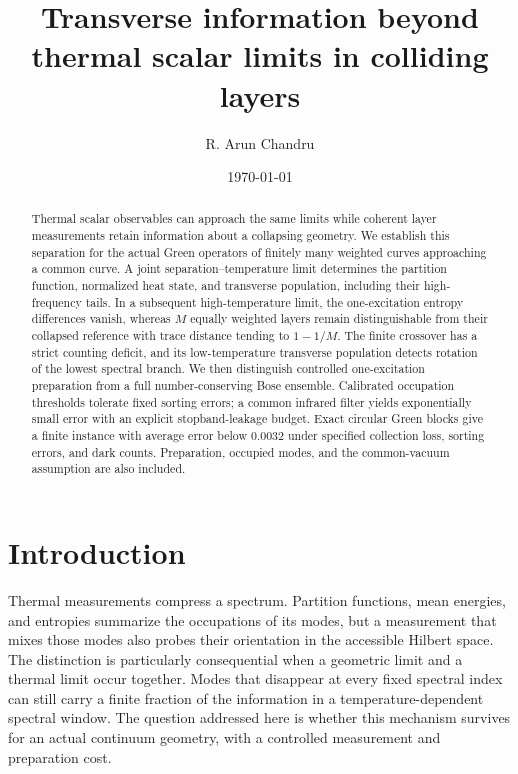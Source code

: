 \documentclass[aps,pra,reprint,superscriptaddress,longbibliography]{revtex4-2}
\begin{document}
\title{Transverse information beyond thermal scalar limits in colliding layers}
\author{R. Arun Chandru}
\date{\today}
\begin{abstract}
Thermal scalar observables can approach the same limits while coherent
layer measurements retain information about a collapsing geometry.
We establish this separation for the actual Green operators of finitely
many weighted curves approaching a common curve. A joint separation--temperature
limit determines the partition function, normalized heat state, and
transverse population, including their high-frequency tails. In a subsequent
high-temperature limit, the one-excitation entropy differences vanish,
whereas $M$ equally weighted layers remain distinguishable from their
collapsed reference with trace distance tending to $1-1/M$. The finite
crossover has a strict counting deficit, and its low-temperature
transverse population detects rotation of the lowest spectral branch.
We then distinguish controlled one-excitation preparation from a full
number-conserving Bose ensemble. Calibrated occupation thresholds tolerate
fixed sorting errors; a common infrared filter yields exponentially small
error with an explicit stopband-leakage budget. Exact circular Green blocks
give a finite instance with average error below $0.0032$ under
specified collection loss, sorting errors, and dark counts. Preparation,
occupied modes, and the common-vacuum assumption are also included.
\end{abstract}
\maketitle

\section{Introduction}

Thermal measurements compress a spectrum. Partition functions, mean
energies, and entropies summarize the occupations of its modes, but a
measurement that mixes those modes also probes their orientation in the
accessible Hilbert space. The distinction is particularly consequential
when a geometric limit and a thermal limit occur together. Modes that
disappear at every fixed spectral index can still carry a finite fraction
of the information in a temperature-dependent spectral window. The
question addressed here is whether this mechanism survives for an actual
continuum geometry, with a controlled measurement and preparation cost.
\end{document}
